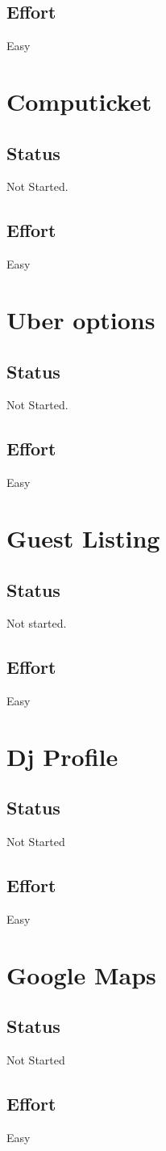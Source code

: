 \documentclass[10pt,a4paper]{article}
\begin{document}
\subsection{Effort}
Easy

\section{Computicket}

\subsection{Status}
Not Started.

\subsection{Effort}
Easy

\section{Uber options}

\subsection{Status}
Not Started.

\subsection{Effort}
Easy

\section{Guest Listing}

\subsection{Status}
Not started.

\subsection{Effort}
Easy

\section{Dj Profile}

\subsection{Status}
Not Started

\subsection{Effort}
Easy

\section{Google Maps}

\subsection{Status}
Not Started

\subsection{Effort}
Easy
\end{document}
